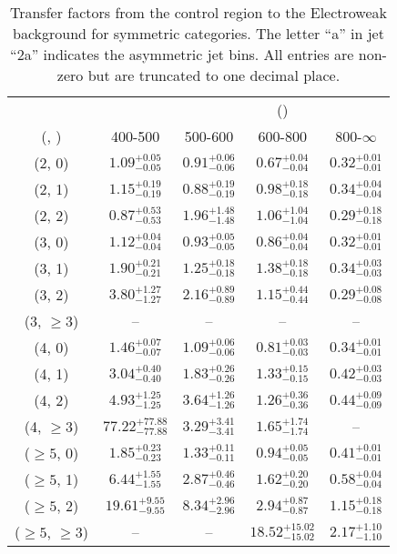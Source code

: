 \begin{table}[h!]
\tiny
\centering
\caption{Transfer factors from the \gj control region to the Electroweak background for symmetric categories. The letter ``a'' in jet \eg ``2a''  indicates the asymmetric jet bins. All entries are non-zero but are truncated to one decimal place.\label{tab:tf_gj_total_sym}}
\begin{tabular}
{ccccc}
	\hline\hline
&	& \multicolumn{4}{c}{\scalht (\gev)} \\ 
	 (\njet,  \nb) & 400-500 & 500-600 & 600-800 & 800-$\infty$ \\ [0.8ex] 
\hline
	(2, 0) & $1.09^{+ 0.05 }_{- 0.05 }$ & $0.91^{+ 0.06 }_{- 0.06 }$ & $0.67^{+ 0.04 }_{- 0.04 }$ & $0.32^{+ 0.01 }_{- 0.01 }$ \\[0.5ex] 
	(2, 1) & $1.15^{+ 0.19 }_{- 0.19 }$ & $0.88^{+ 0.19 }_{- 0.19 }$ & $0.98^{+ 0.18 }_{- 0.18 }$ & $0.34^{+ 0.04 }_{- 0.04 }$ \\[0.5ex] 
	(2, 2) & $0.87^{+ 0.53 }_{- 0.53 }$ & $1.96^{+ 1.48 }_{- 1.48 }$ & $1.06^{+ 1.04 }_{- 1.04 }$ & $0.29^{+ 0.18 }_{- 0.18 }$ \\[0.5ex] 
	(3, 0) & $1.12^{+ 0.04 }_{- 0.04 }$ & $0.93^{+ 0.05 }_{- 0.05 }$ & $0.86^{+ 0.04 }_{- 0.04 }$ & $0.32^{+ 0.01 }_{- 0.01 }$ \\[0.5ex] 
	(3, 1) & $1.90^{+ 0.21 }_{- 0.21 }$ & $1.25^{+ 0.18 }_{- 0.18 }$ & $1.38^{+ 0.18 }_{- 0.18 }$ & $0.34^{+ 0.03 }_{- 0.03 }$ \\[0.5ex] 
	(3, 2) & $3.80^{+ 1.27 }_{- 1.27 }$ & $2.16^{+ 0.89 }_{- 0.89 }$ & $1.15^{+ 0.44 }_{- 0.44 }$ & $0.29^{+ 0.08 }_{- 0.08 }$ \\[0.5ex] 
	(3, $\ge3$) & -- & -- & -- & -- \\[0.5ex] 
	(4, 0) & $1.46^{+ 0.07 }_{- 0.07 }$ & $1.09^{+ 0.06 }_{- 0.06 }$ & $0.81^{+ 0.03 }_{- 0.03 }$ & $0.34^{+ 0.01 }_{- 0.01 }$ \\[0.5ex] 
	(4, 1) & $3.04^{+ 0.40 }_{- 0.40 }$ & $1.83^{+ 0.26 }_{- 0.26 }$ & $1.33^{+ 0.15 }_{- 0.15 }$ & $0.42^{+ 0.03 }_{- 0.03 }$ \\[0.5ex] 
	(4, 2) & $4.93^{+ 1.25 }_{- 1.25 }$ & $3.64^{+ 1.26 }_{- 1.26 }$ & $1.26^{+ 0.36 }_{- 0.36 }$ & $0.44^{+ 0.09 }_{- 0.09 }$ \\[0.5ex] 
	(4, $\ge3$) & $77.22^{+ 77.88 }_{- 77.88 }$ & $3.29^{+ 3.41 }_{- 3.41 }$ & $1.65^{+ 1.74 }_{- 1.74 }$ & -- \\[0.5ex] 
	($\ge5$, 0) & $1.85^{+ 0.23 }_{- 0.23 }$ & $1.33^{+ 0.11 }_{- 0.11 }$ & $0.94^{+ 0.05 }_{- 0.05 }$ & $0.41^{+ 0.01 }_{- 0.01 }$ \\[0.5ex] 
	($\ge5$, 1) & $6.44^{+ 1.55 }_{- 1.55 }$ & $2.87^{+ 0.46 }_{- 0.46 }$ & $1.62^{+ 0.20 }_{- 0.20 }$ & $0.58^{+ 0.04 }_{- 0.04 }$ \\[0.5ex] 
	($\ge5$, 2) & $19.61^{+ 9.55 }_{- 9.55 }$ & $8.34^{+ 2.96 }_{- 2.96 }$ & $2.94^{+ 0.87 }_{- 0.87 }$ & $1.15^{+ 0.18 }_{- 0.18 }$ \\[0.5ex] 
	($\ge5$, $\ge3$) & -- & -- & $18.52^{+ 15.02 }_{- 15.02 }$ & $2.17^{+ 1.10 }_{- 1.10 }$ \\[0.5ex] 
	\hline
	\hline
\end{tabular}
\end{table}
